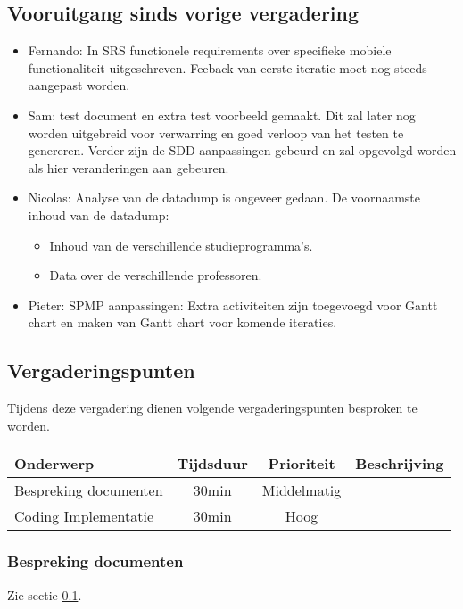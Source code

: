 \subsection{Vooruitgang sinds vorige vergadering} \label{sec:vooruitgangSindsVorigeVergadering}
	\begin{itemize}
		\item Fernando: In SRS functionele requirements over specifieke mobiele functionaliteit uitgeschreven. Feeback van eerste iteratie moet nog steeds aangepast worden.
		\item Sam: test document en extra test voorbeeld gemaakt. Dit zal later nog worden uitgebreid voor verwarring en goed verloop van het testen te genereren. Verder zijn de SDD aanpassingen gebeurd en zal opgevolgd worden als hier veranderingen aan gebeuren.
		\item 
		{
			Nicolas: Analyse van  de datadump is ongeveer gedaan. De voornaamste inhoud van de datadump:
			\begin{itemize}
				\item Inhoud van de verschillende studieprogramma's.
				\item Data over de verschillende professoren.
			\end{itemize}
		}
		\item Pieter: SPMP aanpassingen: Extra activiteiten zijn toegevoegd voor Gantt chart en maken van Gantt chart voor komende iteraties. 
	\end{itemize}
	
\subsection{Vergaderingspunten}
Tijdens deze vergadering dienen volgende vergaderingspunten besproken te worden.
\begin{table} [H]
	\centering
	\begin{tabular} {l|c|c|c}
		Onderwerp & Tijdsduur & Prioriteit & Beschrijving \\ %
		\hline
		Bespreking documenten 		& 30min & Middelmatig &  \\
		Coding Implementatie & 30min & Hoog & \\
	\end{tabular}
\end{table}

\subsubsection{Bespreking documenten}
Zie sectie \ref{sec:vooruitgangSindsVorigeVergadering}.

